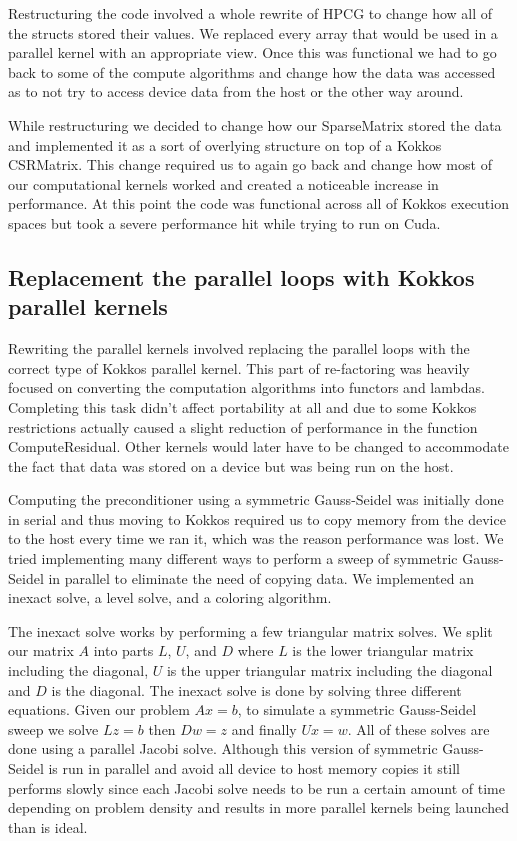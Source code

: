 \documentclass{ccr15}
\begin{document}
Restructuring the code involved a whole rewrite of HPCG to change how all of the structs stored
their values. We replaced every array that would be used in a parallel kernel with an appropriate
view. Once this was functional we had to go back to some of the compute algorithms and change
how the data was accessed as to not try to access device data from the host or the
other way around.

While restructuring we decided to change how our SparseMatrix stored the data and implemented it
as a sort of overlying structure on top of a Kokkos CSRMatrix. This change required us to again
go back and change how most of our computational kernels worked and created a noticeable increase
in performance. At this point the code was functional across all of Kokkos execution spaces but
took a severe performance hit while trying to run on Cuda.

\subsection{Replacement the parallel loops with Kokkos parallel kernels}

Rewriting the parallel kernels involved replacing the parallel loops with the correct type of
Kokkos parallel kernel. This part of re-factoring was heavily focused on converting the
computation algorithms into functors and lambdas. Completing this task didn't affect portability
at all and due to some Kokkos restrictions actually caused a slight reduction of performance in
the function ComputeResidual. Other kernels would later have to be changed to accommodate the fact
that data was stored on a device but was being run on the host.

Computing the preconditioner using a symmetric Gauss-Seidel was initially done in serial and thus
moving to Kokkos required us to copy memory from the device to the host every time we ran it,
which was the reason performance was lost. We tried implementing many different ways to perform
a sweep of symmetric Gauss-Seidel in parallel to eliminate the need of copying data. We
implemented an inexact solve, a level solve, and a coloring algorithm.

The inexact solve works by performing a few triangular matrix solves. We split our matrix $A$ into
parts $L$, $U$, and $D$ where $L$ is the lower triangular matrix including the diagonal, $U$ is the upper
triangular matrix including the diagonal and $D$ is the diagonal. The inexact solve is done by solving three
different equations. Given our problem $A x = b$, to simulate a symmetric Gauss-Seidel sweep we solve
$L z = b$ then $D w = z$ and finally $U x = w$. All of these solves are done using a parallel Jacobi solve.
Although this version of symmetric Gauss-Seidel is run in parallel and avoid all device to host memory
copies it still performs slowly since each Jacobi solve needs to be run a certain amount of time depending
on problem density and results in more parallel kernels being launched than is ideal.
\end{document}
